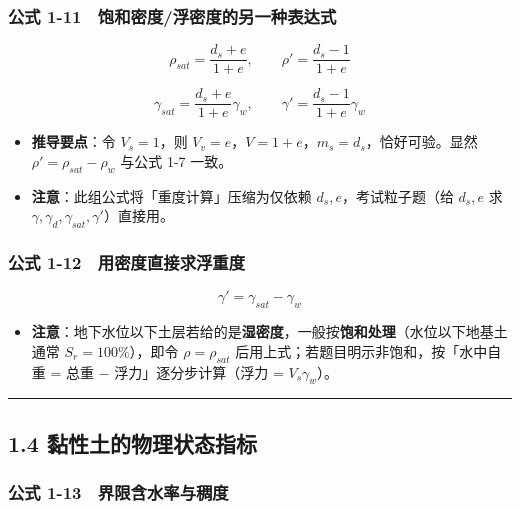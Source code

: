 \documentclass[
]{article}
\providecommand{\tightlist}{%
  \setlength{\itemsep}{0pt}\setlength{\parskip}{0pt}}
\begin{document}
\subsubsection{公式
1-11　饱和密度/浮密度的另一种表达式}\label{ux516cux5f0f-1-11-ux9971ux548cux5bc6ux5ea6ux6d6eux5bc6ux5ea6ux7684ux53e6ux4e00ux79cdux8868ux8fbeux5f0f}

\[\rho_{sat}=\frac{d_s+e}{1+e},\qquad \rho'=\frac{d_s-1}{1+e}\]

\[\gamma_{sat}=\frac{d_s+e}{1+e}\gamma_w,\qquad \gamma'=\frac{d_s-1}{1+e}\gamma_w\]

\begin{itemize}
\tightlist
\item
  \textbf{推导要点}：令 \(V_s=1\)，则
  \(V_v=e\)，\(V=1+e\)，\(m_s=d_s\)，恰好可验。显然
  \(\rho'=\rho_{sat}-\rho_w\) 与公式 1-7 一致。
\item
  \textbf{注意}：此组公式将「重度计算」压缩为仅依赖
  \(d_s,e\)，考试粒子题（给 \(d_s,e\) 求
  \(\gamma,\gamma_d,\gamma_{sat},\gamma'\)）直接用。
\end{itemize}

\subsubsection{公式
1-12　用密度直接求浮重度}\label{ux516cux5f0f-1-12-ux7528ux5bc6ux5ea6ux76f4ux63a5ux6c42ux6d6eux91cdux5ea6}

\[\gamma'=\gamma_{sat}-\gamma_w\]

\begin{itemize}
\tightlist
\item
  \textbf{注意}：地下水位以下土层若给的是\textbf{湿密度}，一般按\textbf{饱和处理}（水位以下地基土通常
  \(S_r=100\%\)），即令 \(\rho=\rho_{sat}\)
  后用上式；若题目明示非饱和，按「水中自重 = 总重 −
  浮力」逐分步计算（浮力 = \(V_s\gamma_w\)）。
\end{itemize}

\begin{center}\rule{0.5\linewidth}{0.5pt}\end{center}

\subsection{1.4
黏性土的物理状态指标}\label{ux9ecfux6027ux571fux7684ux7269ux7406ux72b6ux6001ux6307ux6807}

\subsubsection{公式
1-13　界限含水率与稠度}\label{ux516cux5f0f-1-13-ux754cux9650ux542bux6c34ux7387ux4e0eux7a20ux5ea6}
\end{document}

